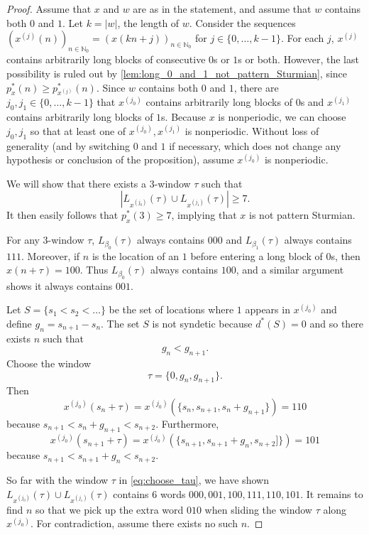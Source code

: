 \documentclass[10pt,a4paper]{amsart}
\newcommand{\N}{\mathbb{N}}
\begin{document}
\begin{proof}
Assume that $x$ and $w$ are as in the statement, and assume that $w$ contains both $0$ and $1$. 
Let $k = |w|$, the length of $w$. Consider the sequences $(x^{(j)}(n))_{n \in \N_0} = (x(kn + j))_{n \in \N_0}$ for $j \in \{0, \ldots, k - 1\}$. For each $j$, $x^{(j)}$ contains arbitrarily long blocks of consecutive $0$s or $1$s or both. However, the last possibility is ruled out by \cref{lem:long_0_and_1_not_pattern_Sturmian}, since $p^*_x(n) \geq p^*_{x^{(j)}}(n)$. 
Since $w$ contains both $0$ and $1$, there are $j_0, j_1 \in \{0, \ldots, k-1\}$ that $x^{(j_0)}$ contains arbitrarily long blocks of $0$s and $x^{(j_1)}$ contains arbitrarily long blocks of $1$s. Because $x$ is nonperiodic, we can choose $j_0, j_1$ so that at least one of $x^{(j_0)}, x^{(j_1)}$ is nonperiodic. Without loss of generality (and by switching $0$ and $1$ if necessary, which does not change any hypothesis or conclusion of the proposition), assume $x^{(j_0)}$ is nonperiodic. 

We will show that there exists a $3$-window $\tau$ such that 
\[
    |L_{x^{(j_0)}}(\tau) \cup L_{x^{(j_1)}}(\tau)| \geq 7.
\]
It then easily follows that $p_{x}^*(3) \geq 7$, implying that $x$ is not pattern Sturmian.

For any $3$-window $\tau$, $L_{\beta_0}(\tau)$ always contains $000$ and $L_{\beta_1}(\tau)$ always contains $111$. Moreover, if $n$ is the location of an $1$ before entering a long block of $0$s, then $x(n + \tau) = 100$. Thus $L_{\beta_0}(\tau)$ always contains $100$, and a similar argument shows it always contains $001$.


Let $S = \{s_1 < s_2 < \ldots\}$ be the set of locations where $1$ appears in $x^{(j_0)}$ and define $g_n = s_{n+1} - s_n$. The set $S$ is not syndetic because $d^*(S) = 0$ and so there exists $n$ such that 
\begin{equation}\label{eq:condition_s_n}
    g_n < g_{n+1}.
\end{equation}
Choose the window
\begin{equation}\label{eq:choose_tau}
    \tau = \{0, g_n, g_{n+1}\}.
\end{equation}
Then 
\[
    x^{(j_0)}(s_n + \tau) = x^{(j_0)}(\{s_n, s_{n+1}, s_n + g_{n+1}\}) = 110
\]
because $s_{n+1} < s_n + g_{n+1} < s_{n+2}$. Furthermore,
\[
    x^{(j_0)}(s_{n+1} + \tau) = x^{(j_0)}(\{s_{n+1}, s_{n+1} + g_n, s_{n+2}]\}) = 101
\]
because $s_{n+1} < s_{n+1} + g_n < s_{n+2}$.

So far with the window $\tau$ in \eqref{eq:choose_tau}, we have shown $L_{x^{(j_0)}}(\tau) \cup L_{x^{(j_1)}}(\tau)$ contains $6$ words $000, 001, 100, 111, 110, 101$. It remains to find $n$ so that we pick up the extra word $010$ when sliding the window $\tau$ along $x^{(j_0)}$. For contradiction, assume there exists no such $n$. 


\end{proof}
\end{document}

